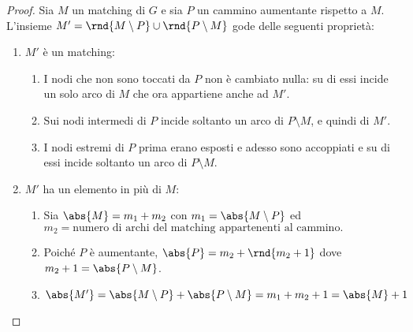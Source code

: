 \documentclass[\main/main.tex]{subfiles}
\begin{document}
\begin{proof}
  Sia \(M\) un matching di \(G\) e sia \(P\) un cammino aumentante rispetto a \(M\). L'insieme \(M' = \rnd{M\setminus P} \cup \rnd{P\setminus M}\) gode delle seguenti proprietà:
  \begin{enumerate}
    \item \(M'\) è un matching:
          \begin{enumerate}
            \item I nodi che non sono toccati da \(P\) non è cambiato nulla: su di essi incide un solo arco di \(M\) che ora appartiene anche ad \(M'\).
            \item Sui nodi intermedi di \(P\) incide soltanto un arco di \(P\setminus M\), e quindi di \(M'\).
            \item I nodi estremi di \(P\) prima erano esposti e adesso sono accoppiati e su di essi incide soltanto un arco di \(P\setminus M\).
          \end{enumerate}
    \item \(M'\) ha un elemento in più di \(M\):
          \begin{enumerate}
            \item Sia \(\abs{M} = m_1 + m_2\) con \(m_1 = \abs{M \setminus P}\) ed \(m_2 = \text{numero di archi del matching appartenenti al cammino.}\)
            \item Poiché \(P\) è aumentante, \(\abs{P} = m_2 + \rnd{m_2 + 1}\) dove \(m_2 + 1 = \abs{P\setminus M}\).
            \item \(\abs{M'} = \abs{M \setminus P} + \abs{P \setminus M} = m_1 + m_2 + 1 = \abs{M} +1\)
          \end{enumerate}
  \end{enumerate}
\end{proof}
\end{document}
